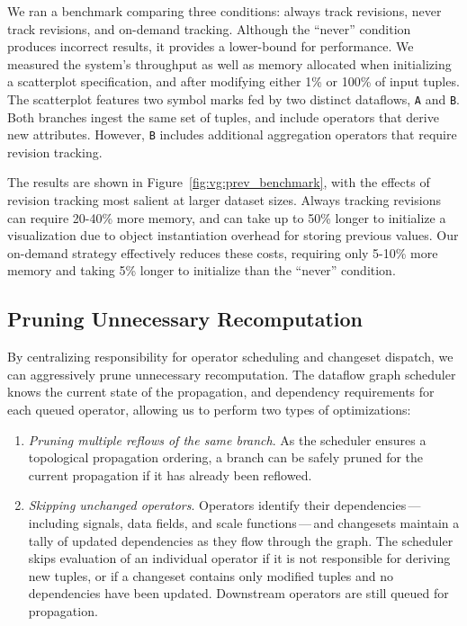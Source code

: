 We ran a benchmark comparing three conditions: always track revisions, never
track revisions, and on-demand tracking. Although the ``never'' condition
produces incorrect results, it provides a lower-bound for performance. We
measured the system's throughput as well as memory allocated when initializing a
scatterplot specification, and after modifying either 1\% or 100\% of input
tuples. The scatterplot features two symbol marks fed by two distinct dataflows,
\texttt{A} and \texttt{B}. Both branches ingest the same set of tuples, and
include operators that derive new attributes. However, \texttt{B} includes
additional aggregation operators that require revision tracking.

The results are shown in Figure~\ref{fig:vg:prev_benchmark}, with the effects of
revision tracking most salient at larger dataset sizes. Always tracking
revisions can require 20-40\% more memory, and can take up to 50\% longer to
initialize a visualization due to object instantiation overhead for storing
previous values. Our on-demand strategy effectively reduces these costs,
requiring only 5-10\% more memory and taking 5\% longer to initialize than the
``never'' condition.

\vspace{-10pt}

\subsection{Pruning Unnecessary Recomputation}
\label{sec:pruning}

\vspace{-7pt}

By centralizing responsibility for operator scheduling and changeset dispatch,
we can aggressively prune unnecessary recomputation. The dataflow graph
scheduler knows the current state of the propagation, and dependency
requirements for each queued operator, allowing us to perform two types of
optimizations:

\begin{enumerate}
  \item \emph{Pruning multiple reflows of the same branch}. As the scheduler
  ensures a topological propagation ordering, a branch can be safely pruned for
  the current propagation if it has already been reflowed.

  \item \emph{Skipping unchanged operators}. Operators identify their
dependencies\,---\,including signals, data fields, and scale functions\,---\,and
changesets maintain a tally of updated dependencies as they flow through the
graph. The scheduler skips evaluation of an individual operator if it is not
responsible for deriving new tuples, or if a changeset contains only modified
tuples and no dependencies have been updated. Downstream operators are still
queued for propagation.
\end{enumerate}

